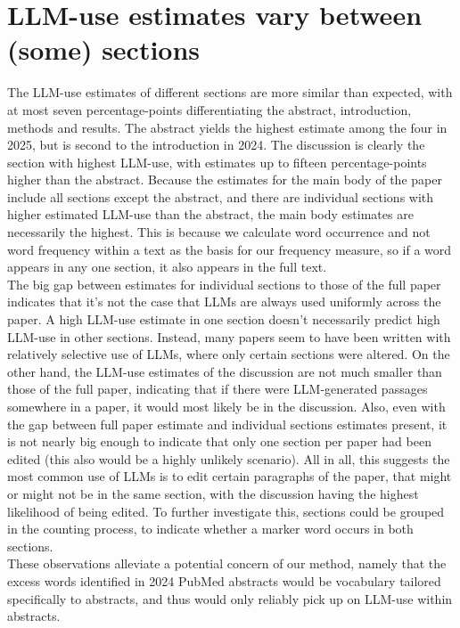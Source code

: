 \section{LLM-use estimates vary between (some) sections}

The LLM-use estimates of different sections are more similar than expected, with at most seven percentage-points differentiating the abstract, introduction, methods and results.
The abstract yields the highest estimate among the four in 2025, but is second to the introduction in 2024.
The discussion is clearly the section with highest LLM-use, with estimates up to fifteen percentage-points higher than the abstract.
Because the estimates for the main body of the paper include all sections except the abstract, and there are individual sections with higher estimated LLM-use than the abstract, the main body estimates are necessarily the highest.
This is because we calculate word occurrence and not word frequency within a text as the basis for our frequency measure, so if a word appears in any one section, it also appears in the full text.
\\
The big gap between estimates for individual sections to those of the full paper indicates that it's not the case that LLMs are always used uniformly across the paper. 
A high LLM-use estimate in one section doesn't necessarily predict high LLM-use in other sections.
Instead, many papers seem to have been written with relatively selective use of LLMs, where only certain sections were altered.
On the other hand, the LLM-use estimates of the discussion are not much smaller than those of the full paper, indicating that if there were LLM-generated passages somewhere in a paper, it would most likely be in the discussion.
Also, even with the gap between full paper estimate and individual sections estimates present, it is not nearly big enough to indicate that only one section per paper had been edited (this also would be a highly unlikely scenario).
All in all, this suggests the most common use of LLMs is to edit certain paragraphs of the paper, that might or might not be in the same section, with the discussion having the highest likelihood of being edited.
To further investigate this, sections could be grouped in the counting process, to indicate whether a marker word occurs in both sections.
\\
These observations alleviate a potential concern of our method, namely that the excess words identified in 2024 PubMed abstracts would be vocabulary tailored specifically to abstracts, and thus would only reliably pick up on LLM-use within abstracts.
